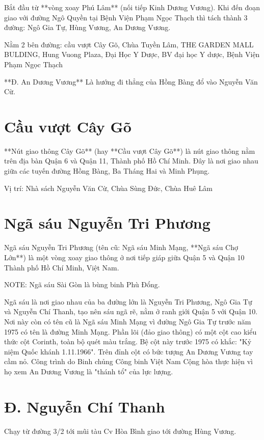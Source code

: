 Bắt đầu từ **vòng xoay Phú Lâm** (nối tiếp Kinh Dương Vương). Khi đến đoạn giao với đường Ngô Quyền tại Bệnh Viện Phạm Ngọc Thạch thì tách thành 3 đường: Ngô Gia Tự, Hùng Vương, An Dương Vương.

Nằm 2 bên đường: cầu vượt Cây Gõ, Chùa Tuyền Lâm, THE GARDEN MALL BULDING, Hung Vuong Plaza, Đại Học Y Dược, BV đại học Y dược, Bệnh Viện Phạm Ngọc Thạch

**Đ. An Dương Vương** Là hướng đi thẳng của Hồng Bàng đổ vào Nguyễn Văn Cừ.

\section{Cầu vượt Cây Gõ}

**Nút giao thông Cây Gõ** (hay **Cầu vượt Cây Gõ**) là nút giao thông nằm trên địa bàn Quận 6 và Quận 11, Thành phố Hồ Chí Minh. Đây là nơi giao nhau giữa các tuyến đường Hồng Bàng, Ba Tháng Hai và Minh Phụng.

Vị trí: Nhà sách Nguyễn Văn Cừ, Chùa Sùng Đức, Chùa Huê Lâm

\section{Ngã sáu Nguyễn Tri Phương}

Ngã sáu Nguyễn Tri Phương (tên cũ: Ngã sáu Minh Mạng, **Ngã sáu Chợ Lớn**) là một vòng xoay giao thông ở nơi tiếp giáp giữa Quận 5 và Quận 10 Thành phố Hồ Chí Minh, Việt Nam.

NOTE: Ngã sáu Sài Gòn là bùng binh Phù Đổng.

Ngã sáu là nơi giao nhau của ba đường lớn là Nguyễn Tri Phương, Ngô Gia Tự và Nguyễn Chí Thanh, tạo nên sáu ngã rẽ, nằm ở ranh giới Quận 5 với Quận 10. Nơi này còn có tên cũ là Ngã sáu Minh Mạng vì đường Ngô Gia Tự trước năm 1975 có tên là đường Minh Mạng. Phần lõi (đảo giao thông) có một cột cao kiểu thức cột Corinth, toàn bộ quét màu trắng. Bệ cột này trước 1975 có khắc: "Kỷ niệm Quốc khánh 1.11.1966". Trên đỉnh cột có bức tượng An Dương Vương tay cầm nỏ. Công trình do Binh chủng Công binh Việt Nam Cộng hòa thực hiện vì họ xem An Dương Vương là "thánh tổ" của lực lượng.

\section{Đ. Nguyễn Chí Thanh}

Chạy từ đường 3/2 tới mũi tàu Cv Hòa Bình giao tới đường Hùng Vương.

